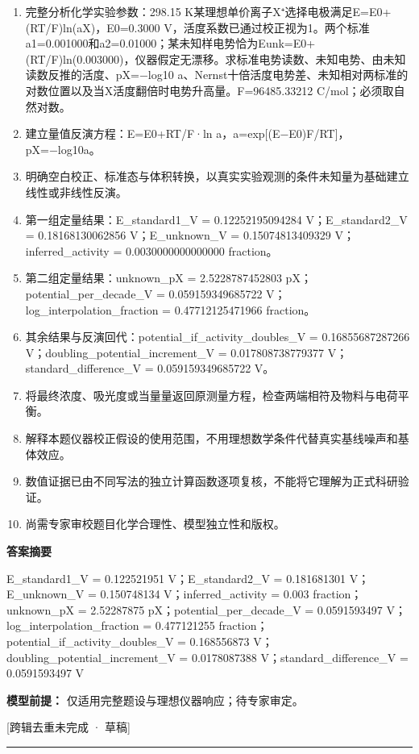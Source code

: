 \documentclass[UTF8,11pt,a4paper]{ctexart}
\begin{document}
\begin{enumerate}
\item 完整分析化学实验参数：298.15 K某理想单价离子X⁺选择电极满足E=E0+(RT/F)ln(aX)，E0=0.3000 V，活度系数已通过校正视为1。两个标准a1=0.001000和a2=0.01000；某未知样电势恰为Eunk=E0+(RT/F)ln(0.003000)，仪器假定无漂移。求标准电势读数、未知电势、由未知读数反推的活度、pX=−log10 a、Nernst十倍活度电势差、未知相对两标准的对数位置以及当X活度翻倍时电势升高量。F=96485.33212 C/mol；必须取自然对数。
\item 建立量值反演方程：E=E0+RT/F·ln a，a=exp[(E−E0)F/RT]，pX=−log10a。
\item 明确空白校正、标准态与体积转换，以真实实验观测的条件未知量为基础建立线性或非线性反演。
\item 第一组定量结果：E\_standard1\_V = 0.12252195094284 V；E\_standard2\_V = 0.18168130062856 V；E\_unknown\_V = 0.15074813409329 V；inferred\_activity = 0.0030000000000000 fraction。
\item 第二组定量结果：unknown\_pX = 2.5228787452803 pX；potential\_per\_decade\_V = 0.059159349685722 V；log\_interpolation\_fraction = 0.47712125471966 fraction。
\item 其余结果与反演回代：potential\_if\_activity\_doubles\_V = 0.16855687287266 V；doubling\_potential\_increment\_V = 0.017808738779377 V；standard\_difference\_V = 0.059159349685722 V。
\item 将最终浓度、吸光度或当量量返回原测量方程，检查两端相符及物料与电荷平衡。
\item 解释本题仪器校正假设的使用范围，不用理想数学条件代替真实基线噪声和基体效应。
\item 数值证据已由不同写法的独立计算函数逐项复核，不能将它理解为正式科研验证。
\item 尚需专家审校题目化学合理性、模型独立性和版权。
\end{enumerate}
\noindent\textbf{答案摘要}\par
E\_standard1\_V = 0.122521951 V；E\_standard2\_V = 0.181681301 V；E\_unknown\_V = 0.150748134 V；inferred\_activity = 0.003 fraction；unknown\_pX = 2.52287875 pX；potential\_per\_decade\_V = 0.0591593497 V；log\_interpolation\_fraction = 0.477121255 fraction；potential\_if\_activity\_doubles\_V = 0.168556873 V；doubling\_potential\_increment\_V = 0.0178087388 V；standard\_difference\_V = 0.0591593497 V\par
\noindent\textbf{模型前提：}
仅适用完整题设与理想仪器响应；待专家审定。\par
\noindent\textcolor{red!65!black}{[跨辑去重未完成 · 草稿]} \par
\medskip\hrule\medskip
{}
\end{document}
